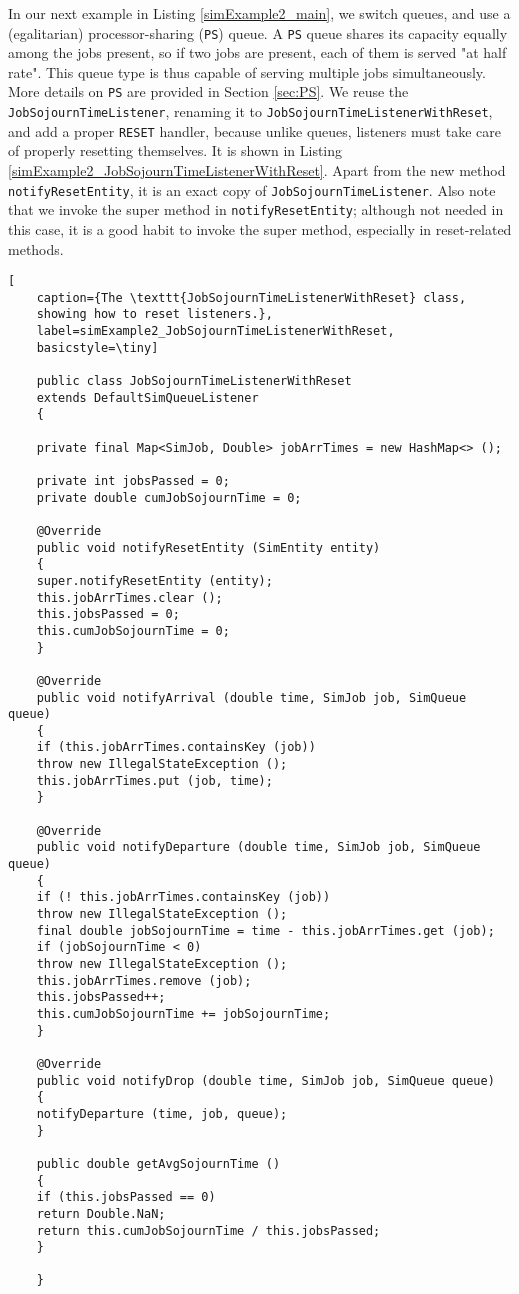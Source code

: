 In our next example in Listing \ref{simExample2_main},
we switch queues, and use a (egalitarian)
processor-sharing (\lstinline|PS|) queue.
A \lstinline|PS| queue shares its capacity equally among the jobs present,
so if two jobs are present, each of them is served
"at half rate".
This queue type is thus capable of serving multiple jobs simultaneously.
More details on \lstinline|PS|
are provided in Section \ref{sec:PS}.
We reuse the \lstinline|JobSojournTimeListener|,
renaming it to \lstinline|JobSojournTimeListenerWithReset|,
and add a proper \lstinline|RESET| handler,
because unlike queues,
listeners must take care of properly resetting themselves.
It is shown in Listing \ref{simExample2_JobSojournTimeListenerWithReset}.
Apart from the new method \lstinline|notifyResetEntity|,
it is an exact copy of \lstinline|JobSojournTimeListener|.
Also note that we invoke the super method in \lstinline|notifyResetEntity|;
although not needed in this case, it is a good habit
to invoke the super method, especially in reset-related methods.

\begin{lstfloat}
	\begin{lstlisting}[
	caption={The \texttt{JobSojournTimeListenerWithReset} class,
	showing how to reset listeners.},
	label=simExample2_JobSojournTimeListenerWithReset,
	basicstyle=\tiny]
	
	public class JobSojournTimeListenerWithReset
	extends DefaultSimQueueListener
	{
	
	private final Map<SimJob, Double> jobArrTimes = new HashMap<> ();
	
	private int jobsPassed = 0;
	private double cumJobSojournTime = 0;
	
	@Override
	public void notifyResetEntity (SimEntity entity)
	{
	super.notifyResetEntity (entity);
	this.jobArrTimes.clear ();
	this.jobsPassed = 0;
	this.cumJobSojournTime = 0;
	}
	
	@Override
	public void notifyArrival (double time, SimJob job, SimQueue queue)
	{
	if (this.jobArrTimes.containsKey (job))
	throw new IllegalStateException ();
	this.jobArrTimes.put (job, time);
	}
	
	@Override
	public void notifyDeparture (double time, SimJob job, SimQueue queue)
	{
	if (! this.jobArrTimes.containsKey (job))
	throw new IllegalStateException ();
	final double jobSojournTime = time - this.jobArrTimes.get (job);
	if (jobSojournTime < 0)
	throw new IllegalStateException ();
	this.jobArrTimes.remove (job);
	this.jobsPassed++;
	this.cumJobSojournTime += jobSojournTime;
	}
	
	@Override
	public void notifyDrop (double time, SimJob job, SimQueue queue)
	{
	notifyDeparture (time, job, queue);
	}
	
	public double getAvgSojournTime ()
	{
	if (this.jobsPassed == 0)
	return Double.NaN;
	return this.cumJobSojournTime / this.jobsPassed;
	}
	
	}
	
	\end{lstlisting}
\end{lstfloat}

